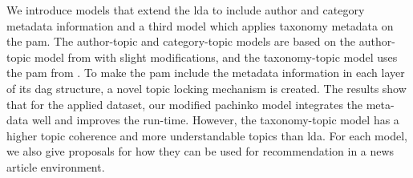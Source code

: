 We introduce models that extend the \gls{lda} to include author and category metadata information and a third model which applies taxonomy metadata on the \gls{pam}.
The author-topic and category-topic models are based on the author-topic model from \citet{author_topic_2012} with slight modifications, and the taxonomy-topic model uses the \gls{pam} from \citet{li2006pachinko}.
To make the \gls{pam} include the metadata information in each layer of its \gls{dag} structure, a novel topic locking mechanism is created.
The results show that for the applied dataset, our modified pachinko model integrates the meta-data well and improves the run-time.
However, the taxonomy-topic model has a higher topic coherence and more understandable topics than \gls{lda}.
For each model, we also give proposals for how they can be used for recommendation in a news article environment.

